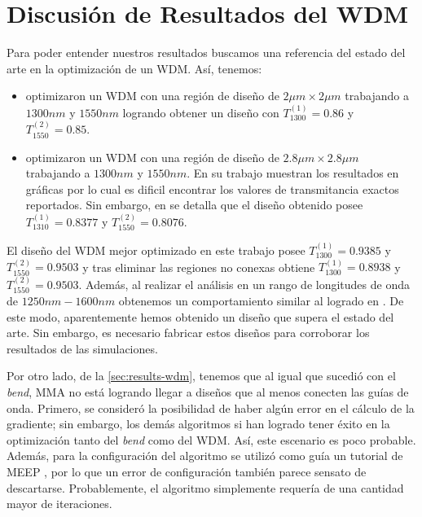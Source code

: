 \section{Discusión de Resultados del WDM}

Para poder entender nuestros resultados buscamos una referencia del estado del arte en la optimización
de un WDM. Así, tenemos:

\begin{itemize}
  \item \cite{Christiansen2021} optimizaron un WDM con una región
  de diseño de $2 \mu m \times 2 \mu m$ trabajando a $1300 nm$ y $1550 nm$ logrando obtener un diseño
  con $T_{1300}^{(1)} = 0.86$ y $T_{1550}^{(2)} = 0.85$.

  \item \cite{Piggott2015} optimizaron un WDM con una región de diseño de $2.8 \mu m \times 2.8 \mu m$
    trabajando a $1300 nm$ y $1550 nm$. En su trabajo muestran los resultados en gráficas por lo cual
    es dificil encontrar los valores de transmitancia exactos reportados. Sin embargo, en
    \cite{Sigmund2016} se detalla que el diseño obtenido posee 
    $T_{1310}^{(1)} = 0.8377$ y $T_{1550}^{(2)} = 0.8076$.
\end{itemize}

El diseño del WDM mejor optimizado en este trabajo posee $T_{1300}^{(1)} = 0.9385$ y 
$T_{1550}^{(2)} = 0.9503$ y tras eliminar las regiones no conexas obtiene
$T_{1300}^{(1)} = 0.8938$ y $T_{1550}^{(2)} = 0.9503$. Además, al realizar el análisis
en un rango de longitudes de onda de $1250nm-1600nm$ obtenemos un comportamiento similar
al logrado en \cite{Piggott2015}.
De este modo, aparentemente hemos obtenido un diseño que supera el estado del arte.
Sin embargo, es necesario fabricar estos diseños para corroborar los resultados de las simulaciones.

Por otro lado, de la \autoref{sec:results-wdm}, tenemos que al igual que sucedió con el \emph{bend},
MMA no está logrando llegar a diseños que al menos conecten las guías de onda.
Primero, se consideró la posibilidad de haber algún error en el cálculo de la gradiente;
sin embargo, los demás algoritmos si han logrado tener éxito en la optimización tanto del \emph{bend}
como del WDM. Así, este escenario es poco probable.
Además, para la configuración del algoritmo se utilizó como guía un tutorial de MEEP \citep{Oskooi2010},
por lo que un error de configuración también parece sensato de descartarse.
Probablemente, el algoritmo simplemente requería de una cantidad mayor de iteraciones.


